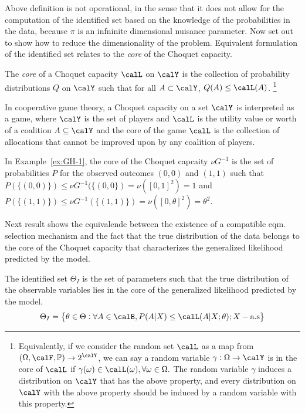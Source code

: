 Above definition is not operational, in the sense that it does not allow for the computation of the identified set based on the knowledge of the probabilities in the data, because $\pi$ is an infninite dimensional nuisance parameter. Now set out to show how to reduce the dimensionality of the problem. Equivalent formulation of the identified set relates to the \emph{core} of the Choquet capacity.
\begin{definition}
	\label{def:GH-5}
	The \emph{core} of a Choquet capacity $\calL$ on $\calY$ is the collection of probability distributions $Q$ on $\calY$ such that for all $A\subset \calY$, $Q(A) \leq \calL(A)$.
	\footnote{Equivalently, if we consider the random set $\calL$ as a map from $(\Omega, \calF, \mathbb{P}) \rightarrow 2^\calY$, we can say a random variable $\gamma:\Omega \rightarrow \calY$ is in the core of $\calL$ if $\gamma(\omega) \in \calL(\omega), \forall \omega \in \Omega.$ The random variable $\gamma$ induces a distribution on $\calY$ that has the above property, and every distribution on $\calY$ with the above property should be induced by a random variable with this property.}
\end{definition}
In cooperative game theory, a Choquet capacity on a set $\calY$ is interpreted as a game, where $\calY$ is the set of players and $\calL$ is the utility value or worth of a coalition $A\subseteq\calY$ and the core of the game $\calL$ is the collection of allocations that cannot be improved upon by any coalition of players.

In Example~\ref{ex:GH-1}, the core of the Choquet capcaity $\nu G^{-1}$ is the set of probabilities $P$ for the observed outcomes $(0,0)$ and $(1,1)$ such that $P(\{(0,0)\}) \leq \nu G^{-1}(\{(0,0\}) = \nu([0,1]^2) =1$ and $P(\{(1,1)\}) \leq \nu G^{-1}(\{(1,1)\}) = \nu([0,\theta]^2) = \theta^2$. 

Next result shows the equivalende between the existence of a compatible eqm. selection mechanism and the fact that the true distribution of the data belongs to the core of the Choquet capacity that characterizes the generalized likelihood predicted by the model. 

\begin{theorem}
	\label{thm:GH-1}
	The identified set $\Theta_I$ is the set of parameters such that the true distribution of the observable variables lies in the core of the generalized likelihood predicted by the model. 
	\[\Theta_I = \left\{\theta \in \Theta: \forall A \in \calB, P(A|X) \leq \calL(A|X;\theta); X-\text{a.s}\right\}\]
\end{theorem}

